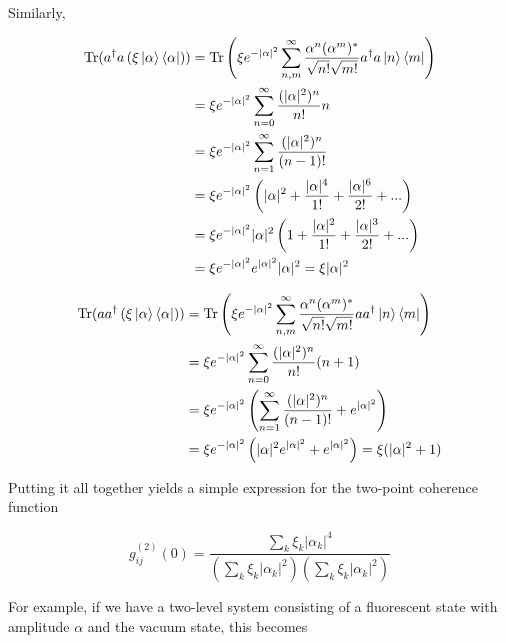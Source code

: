 Similarly,

\begin{align*}
\mathrm{Tr}(a^{\dagger}a \left(\xi \ket{\alpha}\bra{\alpha}\right)) &= \mathrm{Tr}\left(\xi e^{-\lvert\alpha\rvert^{2}}\sum_{n,m}^{\infty}\frac{\alpha^{n}(\alpha^{m})^{*}}{\sqrt{n!}\sqrt{m!}}a^{\dagger}a\ket{n}\bra{m} \right)\\
&= \xi e^{-\lvert\alpha\rvert^{2}}\sum_{n=0}^{\infty}\frac{(\lvert\alpha\rvert^{2})^{n}}{n!}n\\
&= \xi e^{-\lvert\alpha\rvert^{2}}\sum_{n=1}^{\infty}\frac{(\lvert\alpha\rvert^{2})^{n}}{(n-1)!}\\
&= \xi e^{-\lvert\alpha\rvert^{2}}\left(\lvert\alpha\rvert^{2} + \frac{\lvert\alpha\rvert^{4}}{1!} + \frac{\lvert\alpha\rvert^{6}}{2!}+...\right)\\
&= \xi e^{-\lvert\alpha\rvert^{2}}\lvert\alpha\rvert^{2}\left(1 + \frac{\lvert\alpha\rvert^{2}}{1!} + \frac{\lvert\alpha\rvert^{3}}{2!}+...\right)\\
&= \xi e^{-\lvert\alpha\rvert^{2}}e^{\lvert\alpha\rvert^{2}}\lvert\alpha\rvert^{2} = \xi\lvert\alpha\rvert^{2}
\end{align*}

\begin{align*}
\mathrm{Tr}(a a^{\dagger} \left(\xi \ket{\alpha}\bra{\alpha}\right)) &= \mathrm{Tr}\left(\xi e^{-\lvert\alpha\rvert^{2}}\sum_{n,m}^{\infty}\frac{\alpha^{n}(\alpha^{m})^{*}}{\sqrt{n!}\sqrt{m!}}a a^{\dagger}\ket{n}\bra{m} \right)\\
&= \xi e^{-\lvert\alpha\rvert^{2}}\sum_{n=0}^{\infty}\frac{(\lvert\alpha\rvert^{2})^{n}}{n!}(n+1)\\
&= \xi e^{-\lvert\alpha\rvert^{2}}\left(\sum_{n=1}^{\infty}\frac{(\lvert\alpha\rvert^{2})^{n}}{(n-1)!} + e^{\lvert\alpha\rvert^{2}}\right)\\
&= \xi e^{-\lvert\alpha\rvert^{2}}\left(\lvert\alpha\rvert^{2}e^{\lvert\alpha\rvert^{2}} + e^{\lvert\alpha\rvert^{2}}\right) = \xi(\lvert\alpha\rvert^{2} + 1)
\end{align*}

Putting it all together yields a simple expression for the two-point coherence function

\begin{equation*}
g^{(2)}_{ij}(0) = \frac{\sum_{k}\xi_{k}\lvert\alpha_{k}\rvert^{4}}{\left(\sum_{k}\xi_{k}\lvert\alpha_{k}\rvert^{2}\right)\left(\sum_{k}\xi_{k}\lvert\alpha_{k}\rvert^{2}\right)}
\end{equation*}

For example, if we have a two-level system consisting of a fluorescent state with amplitude $\alpha$ and the vacuum state, this becomes

